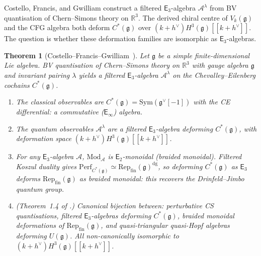 \documentclass[11pt,reqno]{amsart}
\newtheorem{theorem}{Theorem}[section]
\theoremstyle{definition}
\theoremstyle{remark}
\newcommand{\cA}{\mathcal{A}}
\newcommand{\Etwo}{\mathsf{E}_{2}}
\providecommand{\Ethree}{\mathsf{E}_{3}}
\newcommand{\Einf}{\mathsf{E}_{\infty}}
\newcommand{\Sym}{\mathrm{Sym}}
\newcommand{\fg}{\mathfrak{g}}
\newcommand{\RR}{\mathbb{R}}
\numberwithin{equation}{section}
\begin{document}
Costello, Francis, and Gwilliam construct a filtered
$\Ethree$-algebra $\cA^\lambda$ from BV quantisation of
Chern--Simons theory on $\RR^3$. The derived chiral centre
of $V_k(\fg)$ and the CFG algebra both deform $C^*(\fg)$
over $(k+h^\vee) H^3(\fg)[[k+h^\vee]]$. The question is whether
these deformation families are isomorphic as
$\Ethree$-algebras.

\begin{theorem}[Costello--Francis--Gwilliam~\cite{CFG26}]
\label{thm:cfg}
Let $\fg$ be a simple finite-dimensional Lie algebra.
BV quantisation of Chern--Simons theory on $\RR^3$ with
gauge algebra $\fg$ and invariant pairing $\lambda$ yields
a filtered $\Ethree$-algebra $\cA^\lambda$ on the
Chevalley--Eilenberg cochains $C^*(\fg)$.
\begin{enumerate}[label=\textup{(\roman*)}]
\item The classical observables are
  $C^*(\fg) = \Sym(\fg^\vee[-1])$
  with the CE differential: a commutative
  \textup{(}$\Einf$\textup{)} algebra.
\item The quantum observables
  $\cA^\lambda$ are a filtered $\Ethree$-algebra deforming
  $C^*(\fg)$, with deformation space
  $(k+h^\vee) H^3(\fg)[[k+h^\vee]]$.
\item For any $\Ethree$-algebra $\cA$,
  $\mathrm{Mod}_\cA$ is $\Etwo$-monoidal \textup{(}braided
  monoidal\textup{)}. Filtered Koszul duality gives
  $\mathrm{Perf}_{C^*(\fg)}
  \simeq \mathrm{Rep}_{\mathrm{fin}}(\fg)^{\mathrm{dg}}$,
  so deforming $C^*(\fg)$ as $\Ethree$ deforms
  $\mathrm{Rep}_{\mathrm{fin}}(\fg)$ as braided monoidal:
  this recovers the Drinfeld--Jimbo quantum group.
\item \textup{(Theorem~1.4 of \cite{CFG26}.)} Canonical
  bijection between: perturbative CS quantisations, filtered
  $\Ethree$-algebras deforming $C^*(\fg)$, braided monoidal
  deformations of $\mathrm{Rep}_{\mathrm{fin}}(\fg)$, and
  quasi-triangular quasi-Hopf algebras deforming $U(\fg)$.
  All non-canonically isomorphic to
  $(k+h^\vee) H^3(\fg)[[k+h^\vee]]$.
\end{enumerate}
\end{theorem}
\end{document}
